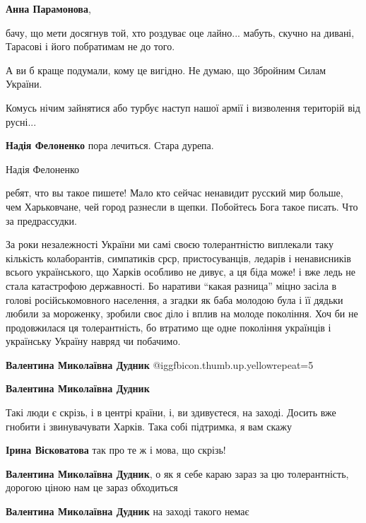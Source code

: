 \begin{itemize}
\begin{itemize}
\textbf{Анна Парамонова}, 

бачу, що мети досягнув той, хто роздуває оце лайно... мабуть, скучно на дивані,
Тарасові і його побратимам не до того.

А ви б краще подумали, кому це вигідно. Не думаю, що Збройним Силам України.

Комусь нічим зайнятися або турбує наступ нашої армії і визволення територій від
русні...

\textbf{Надія Фелоненко} пора лечиться. Стара дурепа.

Надія Фелоненко

ребят, что вы такое пишете! Мало кто сейчас ненавидит русский мир больше, чем
Харьковчане, чей город разнесли в щепки. Побойтесь Бога такое писать. Что за
предрассудки.

\end{itemize} %


За роки незалежності України ми самі своєю толерантністю виплекали таку
кількість колаборантів, симпатиків срср, пристосуванців, ледарів і ненависників
всього українського, що Харків особливо не дивує, а ця біда може! і вже ледь не
стала катастрофою державності. Бо наративи \enquote{какая разница} міцно засіла в
голові російськомовного населення, а згадки як баба молодою була і її дядьки
любили за мороженку, зробили своє діло і вплив на молоде покоління. Хоч би не
продовжилася ця толерантність, бо втратимо ще одне покоління українців і
українську Україну навряд чи побачимо.

\begin{itemize} %
\textbf{Валентина Миколаївна Дудник}  @igg{fbicon.thumb.up.yellow}{repeat=5} 

\textbf{Валентина Миколаївна Дудник}

Такі люди є скрізь, і в центрі країни, і, ви здивуєтеся, на заході. Досить вже
гнобити і звинувачувати Харків. Така собі підтримка, я вам скажу 🫤

\textbf{Ірина Вісковатова} так про те ж і мова, що скрізь!

\textbf{Валентина Миколаївна Дудник}, о як я себе караю зараз за цю толерантність, дорогою ціною нам це зараз обходиться

\textbf{Валентина Миколаївна Дудник} на заході такого немає


\end{itemize}
\end{itemize}
